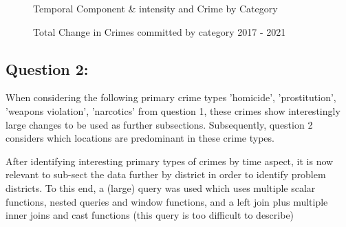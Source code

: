 \documentclass[a4paper]{article}
\begin{document}
\begin{figure}%
    \centering
    \qquad
    \caption{Temporal Component \& intensity and Crime by Category}%
    \label{fig:example}%
\end{figure}


\begin{figure}%
    \centering
    \qquad
    \caption{Total Change in Crimes committed by category 2017 - 2021}%
    \label{fig:example}%
\end{figure}




\subsection{Question 2:}


When considering the following primary crime types 'homicide', 'prostitution', 'weapons violation', 'narcotics' from question 1, these crimes show interestingly large changes to be used as further subsections. Subsequently, question 2 considers which locations are predominant in these crime types. 

After identifying interesting primary types of crimes by time aspect, it is now relevant to sub-sect the data further by district in order to identify problem districts. To this end, a (large) query was used which uses multiple scalar functions, nested queries and window functions, and a left join plus multiple inner joins and cast functions (this query is too difficult to describe)
\end{document}
